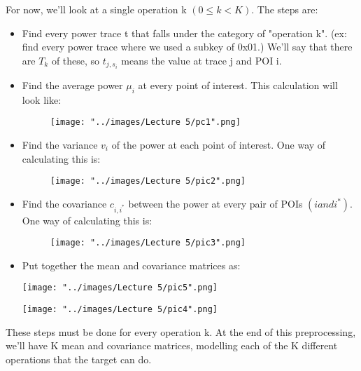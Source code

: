 \documentclass{report}
\begin{document}
    For now, we'll look at a single operation k $(0 \le k < K)$. The steps are:
    \begin{itemize}
      \item Find every power trace t that falls under the category of "operation k". (ex: find every power trace where we used a subkey of 0x01.) We'll say that there are $T_k$ of these, so $t_{j, s_i}$ means the value at trace j and POI i.
      \item Find the average power $\mu_i$ at every point of interest. This calculation will look like:
      \begin{figure}[htp]
      \centering
      \texttt{[image: "../images/Lecture 5/pc1".png]}
      \end{figure}
       
      \item Find the variance $v_i$ of the power at each point of interest. One way of calculating this is:
      \begin{figure}[htp]
      \centering
      \texttt{[image: "../images/Lecture 5/pic2".png]}
      \end{figure}
    
      \item Find the covariance $c_{i, i^*}$ between the power at every pair of POIs $(i and i^*)$. One way of calculating this is:
      \begin{figure}[htp]
      \centering
      \texttt{[image: "../images/Lecture 5/pic3".png]}
      \end{figure}
      \item Put together the mean and covariance matrices as:
    
      \begin{minipage}{\linewidth}
      \centering
      \texttt{[image: "../images/Lecture 5/pic5".png]}
      \end{minipage}
      \begin{minipage}{\linewidth}
      \centering
      \texttt{[image: "../images/Lecture 5/pic4".png]}
      \end{minipage}
      
    \end{itemize}
    
    These steps must be done for every operation k. At the end of this preprocessing, we'll have K mean and covariance matrices, modelling each of the K different operations that the target can do.
\end{document}
